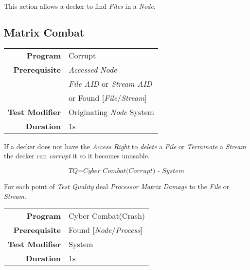 \hfill

This action allows a decker to find \emph{Files} in a \emph{Node}.

\subsection{Matrix Combat}
\label{subsec:matrix combat}


\label{par:corrupt action}

\begin{tabular}{rl}
    \textbf{Program}       & Corrupt                              \\
    \textbf{Prerequisite}  & \emph{Accessed} \emph{Node}          \\
                           & \emph{File AID} or \emph{Stream AID} \\
                           & or Found [\emph{File}/\emph{Stream}] \\
    \textbf{Test Modifier} & Originating \emph{Node} System       \\
    \textbf{Duration}      & 1s                                   \\
\end{tabular}

\hfill

If a decker does not have the \emph{Access Right} to \emph{delete} a \emph{File}
or \emph{Terminate} a \emph{Stream} the decker can \emph{corrupt} it so it becomes
unusable.

\begin{equation*}
    \textit{TQ} = \textit{Cyber Combat(Corrupt) - System}
\end{equation*}

For each point of \emph{Test Quality} deal \emph{Processor} \emph{Matrix Damage}
to the \emph{File} or \emph{Stream}.


\label{par:crash}

\begin{tabular}{rl}
    \textbf{Program}       & Cyber Combat(Crash)                \\
    \textbf{Prerequisite}  & Found [\emph{Node}/\emph{Process}] \\
    \textbf{Test Modifier} & System                             \\
    \textbf{Duration}      & 1s                                 \\
\end{tabular}

